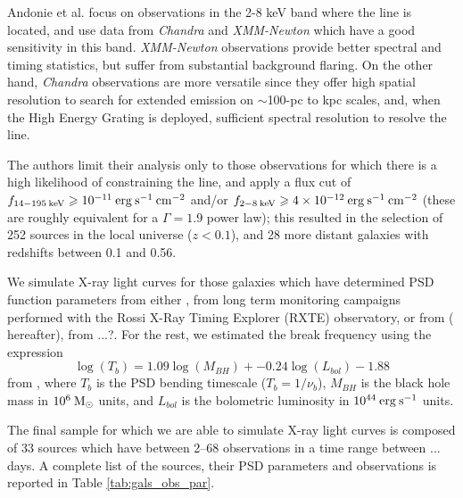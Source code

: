 Andonie et al. focus on observations in the 2-8 keV band where the \kalfa{} line is located, and use data from \textit{Chandra} \citep{2000SPIE.4012....2W} and \textit{XMM-Newton} \citep{2001A&A...365L...1J} which have a good sensitivity in this band. \textit{XMM-Newton} observations provide better spectral and timing statistics, but suffer from substantial background flaring.
On the other hand, \textit{Chandra} observations are more versatile since they offer high spatial resolution to search for extended \kalfa{} emission on $\sim$100-pc to kpc scales, and, when the High Energy Grating is deployed, sufficient spectral resolution to resolve the \kalfa{} line.

The authors limit their analysis only to those observations for which there is a high likelihood of constraining the \kalfa{} line, and apply a flux cut of $f_{\rm 14-195\: keV} \geqslant  10^{-11}\: {\rm erg\:s^{-1}\:cm^{-2}}$ and/or $f_{\rm 2-8\: keV} \geqslant  4\times 10^{-12} \: {\rm erg\:s^{-1}\:cm^{-2}}$ (these are roughly equivalent for a $\Gamma{=}1.9$ power law); this resulted in the selection of 252 sources in the local universe ($z<0.1$), and 28 more distant galaxies with redshifts between 0.1 and 0.56.

We simulate X-ray light curves for those galaxies which have determined PSD function parameters from either \citet{summons_thesis}, from long term monitoring campaigns performed with the Rossi X-Ray Timing Explorer (RXTE) observatory, or from \citet{2012A&A...544A..80G} ( hereafter), from ...?. For the rest, we estimated the break frequency using the expression
\begin{equation}
    \log(T_b)=1.09\log(M_{BH}) + -0.24\log(L_{bol}) - 1.88
    \label{Eq:T_b}
\end{equation}
from , where $T_b$ is the PSD bending timescale ($T_b = 1/\nu_{b}$), $M_{BH}$ is the black hole mass in $10^6\:\rm M_{\odot}$ units, and  $L_{bol}$ is the bolometric luminosity in $10^{44}\:\rm erg\:s^{-1}$ units.

The final sample for which we are able to simulate X-ray light curves is composed of 33 sources which have between 2--68 observations in a time range between ... days. A complete list of the sources, their PSD parameters and observations is reported in Table \ref{tab:gals_obs_par}.

